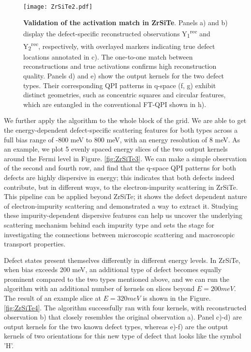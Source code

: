 \begin{figure}
	\texttt{[image: ZrSiTe2.pdf]} 
	\centering
	\caption[\textbf{Validation of the activation match in ZrSiTe}]{\textbf{Validation of the activation match in ZrSiTe}. Panels a) and b) display the defect-specific reconstructed observations Y\textsubscript{1}\textsuperscript{rec} and Y\textsubscript{2}\textsuperscript{rec}, respectively, with overlayed markers indicating true defect locations annotated in c). The one-to-one match between reconstructions and true activations confirms high reconstruction quality. Panels d) and e) show the output kernels for the two defect types. Their corresponding QPI patterns in q-space (f, g) exhibit distinct geometries, such as concentric squares and circular features, which are entangled in the conventional FT-QPI shown in h).}
	\label{fig:ZrSiTe2}
\end{figure}

We further apply the algorithm to the whole block of the grid. We are able to get the energy-dependent defect-specific scattering features for both types across a full bias range of -800 meV to 800 meV, with an energy resolution of 8 meV. As an example, we plot 5 evenly spaced energy slices of the two output kernels around the Fermi level in Figure. \ref{fig:ZrSiTe3}. We can make a simple observation of the second and fourth row, and find that the q-space QPI patterns for both defects are highly dispersive in energy; this indicates that both defects indeed contribute, but in different ways, to the electron-impurity scattering in ZrSiTe. This pipeline can be applied beyond ZrSiTe; it shows the defect dependent nature of electron-impurity scattering and demonstrated a way to extract it. Studying these impurity-dependent dispersive features can help us uncover the underlying scattering mechanism behind each impurity type and sets the stage for investigating the connections between microscopic scattering and macroscopic transport properties. 

Defect states present themselves differently in different energy levels. In ZrSiTe, when bias exceeds 200 meV, an additional type of defect becomes equally prominent compared to the two types mentioned above, and we can run the algorithm with an additional number of kernels on slices beyond $E=200meV$. The result of an example slice at $E=320meV$ is shown in the Figure. \ref{fig:ZrSiTe4}. The algorithm successfully ran with four kernels, with reconstructed observation b) that closely resembles the original observation a). Panel c)-d) are output kernels for the two known defect types, whereas e)-f) are the output kernels of two orientations for this new type of defect that looks like the symbol 'H'.  


